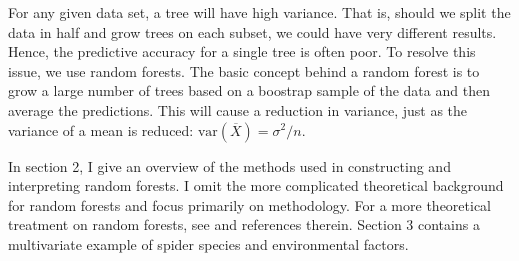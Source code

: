 For any given data set, a tree will have high variance. That is, should we split the data in half and grow trees on each subset, we could have very different results. Hence, the predictive accuracy for a single tree is often poor. To resolve this issue, we use random forests. The basic concept behind a random forest is to grow a large number of trees based on a boostrap sample of the data and then average the predictions. This will cause a reduction in variance, just as the variance of a mean is reduced: $\mathrm{var}(\overline{X}) = \sigma^2/n$.

In section 2, I give an overview of the methods used in constructing and interpreting random forests. I omit the more complicated theoretical background for random forests and focus primarily on methodology. For a more theoretical treatment on random forests, see \cite{breiman:2001} and references therein. Section 3 contains a multivariate example of spider species and environmental factors. %
